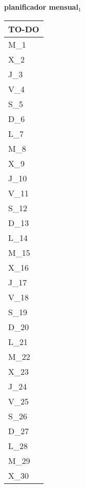 \clearpage
\raggedright{
	\fontsize{25}{50}\selectfont
	\textbf{\NextYear}
}\scriptsize{\textbf{planificador mensual$_1$}}\\[11.3pt]



	\noindent\dotfill
	\renewcommand{\arraystretch}{1.5}\scriptsize
		\begin{longtabu} to \textwidth { X[l]}
		\centering \small{\textbf{TO-DO}} \\
		\toprule
		M_{1} \dotfill\\
		X_{2} \dotfill\\
		J_{3} \dotfill\\
		V_{4} \dotfill\\
		S_{5} \dotfill\\
		D_{6} \dotfill\\
		\hline
		L_{7} \dotfill\\
		M_{8} \dotfill\\
		X_{9} \dotfill\\
		J_{10} \dotfill\\
		V_{11} \dotfill\\
		S_{12} \dotfill\\
		D_{13} \dotfill\\
		\hline
		L_{14} \dotfill\\
		M_{15} \dotfill\\
		X_{16} \dotfill\\
		J_{17} \dotfill\\
		V_{18} \dotfill\\
		S_{19} \dotfill\\
		D_{20} \dotfill\\
		\hline
		L_{21} \dotfill\\
		M_{22} \dotfill\\
		X_{23} \dotfill\\
		J_{24} \dotfill\\
		V_{25} \dotfill\\
		S_{26} \dotfill\\
		D_{27} \dotfill\\
		\hline
		L_{28} \dotfill\\
		M_{29} \dotfill\\
		X_{30} \dotfill\\

		\bottomrule

	\end{longtabu}


\clearpage
